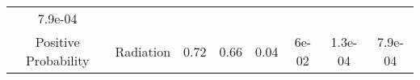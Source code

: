 \documentclass[12pt,]{article}
\begin{document}
\begin{longtable}[]{@{}cccccccc@{}}
\begin{minipage}[t]{0.08\columnwidth}
7.9e-04\strut
\end{minipage}\tabularnewline
\begin{minipage}[t]{0.12\columnwidth}\centering\strut
Positive Probability\strut
\end{minipage} & \begin{minipage}[t]{0.11\columnwidth}\centering\strut
Radiation\strut
\end{minipage} & \begin{minipage}[t]{0.13\columnwidth}\centering\strut
0.72\strut
\end{minipage} & \begin{minipage}[t]{0.08\columnwidth}\centering\strut
0.66\strut
\end{minipage} & \begin{minipage}[t]{0.13\columnwidth}\centering\strut
0.04\strut
\end{minipage} & \begin{minipage}[t]{0.07\columnwidth}\centering\strut
6e-02\strut
\end{minipage} & \begin{minipage}[t]{0.06\columnwidth}\centering\strut
1.3e-04\strut
\end{minipage} & \begin{minipage}[t]{0.08\columnwidth}\centering\strut
7.9e-04\strut
\end{minipage}\tabularnewline
\bottomrule
\end{longtable}

\elandscape
\end{document}
